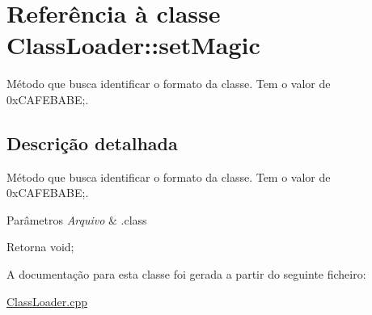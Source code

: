 \hypertarget{class_class_loader_1_1set_magic}{}\section{Referência à classe Class\+Loader\+:\+:set\+Magic}
\label{class_class_loader_1_1set_magic}


Método que busca identificar o formato da classe. Tem o valor de 0x\+C\+A\+F\+E\+B\+A\+BE;.  




\subsection{Descrição detalhada}
Método que busca identificar o formato da classe. Tem o valor de 0x\+C\+A\+F\+E\+B\+A\+BE;. 


\begin{DoxyParams}{Parâmetros}
{\em Arquivo} & .class \\
\hline
\end{DoxyParams}
\begin{DoxyReturn}{Retorna}
void; 
\end{DoxyReturn}


A documentação para esta classe foi gerada a partir do seguinte ficheiro\+:\begin{DoxyCompactItemize}
\item 
\hyperlink{_class_loader_8cpp}{Class\+Loader.\+cpp}\end{DoxyCompactItemize}

